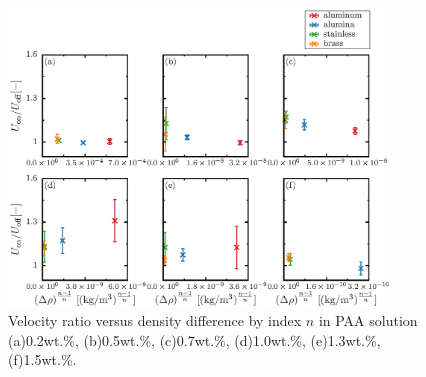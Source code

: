\begin{figure}[ht]
    \centering
    \includegraphics[width=0.9\textwidth]{./5-Results/rhoUdiff_index_n.eps}
    \caption{Velocity ratio versus density difference by index $n$ in PAA solution (a)0.2wt.\%, (b)0.5wt.\%, (c)0.7wt.\%, (d)1.0wt.\%, (e)1.3wt.\%, (f)1.5wt.\%.}
    \label{fig:rhoUdiff_n}
\end{figure}
